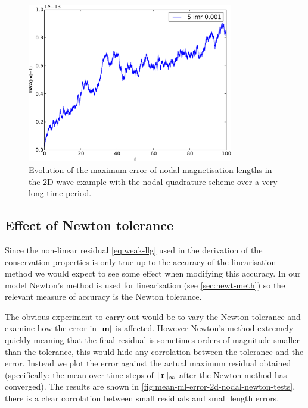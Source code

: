 \begin{figure}[ht!]
  \centering
\includegraphics[width=0.8\textwidth]{plots/2d_wave_solution_m_length_long_time/-maxmathbfm-1vst.pdf}
\caption{Evolution of the maximum error of nodal magnetisation lengths in the 2D wave example with the nodal quadrature scheme over a very long time period.}
\label{fig:mean-ml-error-2d-nodal-long-time}
\end{figure}



\subsection{Effect of Newton tolerance}
\label{sec:effect-newt-toler-m-conservation}

Since the non-linear residual \eqref{eq:weak-llg} used in the derivation of the conservation properties is only true up to the accuracy of the linearisation method we would expect to see some effect when modifying this accuracy.
In our model Newton's method is used for linearisation (see \autoref{sec:newt-meth}) so the relevant measure of accuracy is the Newton tolerance.

The obvious experiment to carry out would be to vary the Newton tolerance and examine how the error in $\left|{\mathbf{m}} \right|$ is affected.
However Newton's method extremely quickly meaning that the final residual is sometimes orders of magnitude smaller than the tolerance, this would hide any corrolation between the tolerance and the error.
Instead we plot the error against the actual maximum residual obtained (specifically: the mean over time steps of $\lVert \mathbf{r} \rVert_\infty$ after the Newton method has converged). 
The results are shown in \autoref{fig:mean-ml-error-2d-nodal-newton-tests}, there is a clear corrolation between small residuals and small length errors.


